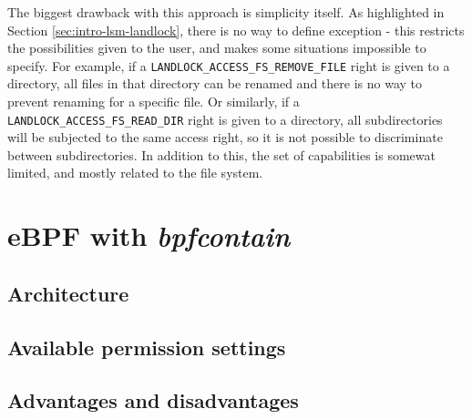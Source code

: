 The biggest drawback with this approach is simplicity itself. As highlighted in Section \ref{sec:intro-lsm-landlock},
there is no way to define exception - this restricts the possibilities given to the user, and makes some situations
impossible to specify. For example, if a \texttt{LANDLOCK\_ACCESS\_FS\_REMOVE\_FILE} right is given to a directory,
all files in that directory can be renamed and there is no way to prevent renaming for a specific file.
Or similarly, if a \texttt{LANDLOCK\_ACCESS\_FS\_READ\_DIR} right is given to a directory, all subdirectories
will be subjected to the same access right, so it is not possible to discriminate between subdirectories.
In addition to this, the set of capabilities is somewat limited, and mostly related to the file system.

\section{eBPF with \textit{bpfcontain}}

\subsection{Architecture}

\subsection{Available permission settings}

\subsection{Advantages and disadvantages}